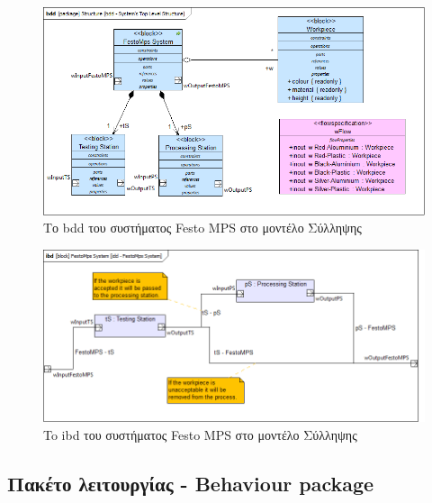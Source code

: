 \documentclass[a4paper,12pt,twoside]{report}
\begin{document}
{\begin{appendices}
			\clearpage
				\begin{figure}[hp]
					\centering
					\includegraphics[scale=0.45]{ConceptionalModel_bdd-SystemsTopLevelStructure.png}
					\caption{Το bdd του συστήματος Festo MPS στο μοντέλο Σύλληψης}
					\label{φωτ:Το bdd του συστήματος Festo MPS στο μοντέλο Σύλληψης}
				\end{figure}
				\begin{figure}[hp]
					\centering
					\includegraphics[scale=0.45]{ConceptionalModel_idd-FestoMpsSystem.png}
					\caption{To ibd του συστήματος Festo MPS στο μοντέλο Σύλληψης}
					\label{φωτ:To ibd του συστήματος Festo MPS στο μοντέλο Σύλληψης}
				\end{figure}
			
			\FloatBarrier
			\subsection{Πακέτο λειτουργίας - Behaviour package}


\end{appendices}}
\end{document}
